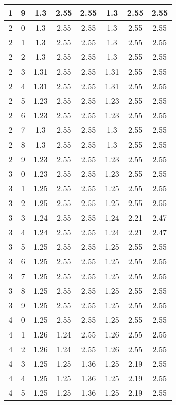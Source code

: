 \begin{longtable}{|c|c||c||c|c||c|c|c|}
	1 & 9 & 1.3 & 2.55 & 2.55 & 1.3 & 2.55 & 2.55 \\ \hline
	2 & 0 & 1.3 & 2.55 & 2.55 & 1.3 & 2.55 & 2.55 \\ \hline
	2 & 1 & 1.3 & 2.55 & 2.55 & 1.3 & 2.55 & 2.55 \\ \hline
	2 & 2 & 1.3 & 2.55 & 2.55 & 1.3 & 2.55 & 2.55 \\ \hline
	2 & 3 & 1.31 & 2.55 & 2.55 & 1.31 & 2.55 & 2.55 \\ \hline
	2 & 4 & 1.31 & 2.55 & 2.55 & 1.31 & 2.55 & 2.55 \\ \hline
	2 & 5 & 1.23 & 2.55 & 2.55 & 1.23 & 2.55 & 2.55 \\ \hline
	2 & 6 & 1.23 & 2.55 & 2.55 & 1.23 & 2.55 & 2.55 \\ \hline
	2 & 7 & 1.3 & 2.55 & 2.55 & 1.3 & 2.55 & 2.55 \\ \hline
	2 & 8 & 1.3 & 2.55 & 2.55 & 1.3 & 2.55 & 2.55 \\ \hline
	2 & 9 & 1.23 & 2.55 & 2.55 & 1.23 & 2.55 & 2.55 \\ \hline
	3 & 0 & 1.23 & 2.55 & 2.55 & 1.23 & 2.55 & 2.55 \\ \hline
	3 & 1 & 1.25 & 2.55 & 2.55 & 1.25 & 2.55 & 2.55 \\ \hline
	3 & 2 & 1.25 & 2.55 & 2.55 & 1.25 & 2.55 & 2.55 \\ \hline
	3 & 3 & 1.24 & 2.55 & 2.55 & 1.24 & 2.21 & 2.47 \\ \hline
	3 & 4 & 1.24 & 2.55 & 2.55 & 1.24 & 2.21 & 2.47 \\ \hline
	3 & 5 & 1.25 & 2.55 & 2.55 & 1.25 & 2.55 & 2.55 \\ \hline
	3 & 6 & 1.25 & 2.55 & 2.55 & 1.25 & 2.55 & 2.55 \\ \hline
	3 & 7 & 1.25 & 2.55 & 2.55 & 1.25 & 2.55 & 2.55 \\ \hline
	3 & 8 & 1.25 & 2.55 & 2.55 & 1.25 & 2.55 & 2.55 \\ \hline
	3 & 9 & 1.25 & 2.55 & 2.55 & 1.25 & 2.55 & 2.55 \\ \hline
	4 & 0 & 1.25 & 2.55 & 2.55 & 1.25 & 2.55 & 2.55 \\ \hline
	4 & 1 & 1.26 & 1.24 & 2.55 & 1.26 & 2.55 & 2.55 \\ \hline
	4 & 2 & 1.26 & 1.24 & 2.55 & 1.26 & 2.55 & 2.55 \\ \hline
	4 & 3 & 1.25 & 1.25 & 1.36 & 1.25 & 2.19 & 2.55 \\ \hline
	4 & 4 & 1.25 & 1.25 & 1.36 & 1.25 & 2.19 & 2.55 \\ \hline
	4 & 5 & 1.25 & 1.25 & 1.36 & 1.25 & 2.19 & 2.55 \\ \hline

\end{longtable}
